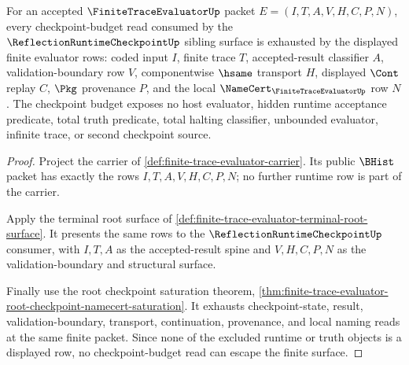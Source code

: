 \begin{theorem}
\label{thm:finite-trace-evaluator-checkpoint-budget-exhaustion}
For an accepted $\FiniteTraceEvaluatorUp$ packet
$E=(I,T,A,V,H,C,P,N)$, every checkpoint-budget read consumed by the
$\ReflectionRuntimeCheckpointUp$ sibling surface is exhausted by the displayed
finite evaluator rows: coded input $I$, finite trace $T$, accepted-result
classifier $A$, validation-boundary row $V$, componentwise $\hsame$ transport
$H$, displayed $\Cont$ replay $C$, $\Pkg$ provenance $P$, and the local
$\NameCert_{\FiniteTraceEvaluatorUp}$ row $N$. The checkpoint budget exposes no
host evaluator, hidden runtime acceptance predicate, total truth predicate,
total halting classifier, unbounded evaluator, infinite trace, or second
checkpoint source.
\end{theorem}
\begin{proof}
Project the carrier of \autoref{def:finite-trace-evaluator-carrier}. Its
public $\BHist$ packet has exactly the rows $I,T,A,V,H,C,P,N$; no further
runtime row is part of the carrier.

Apply the terminal root surface of
\autoref{def:finite-trace-evaluator-terminal-root-surface}. It presents the
same rows to the $\ReflectionRuntimeCheckpointUp$ consumer, with $I,T,A$ as the
accepted-result spine and $V,H,C,P,N$ as the validation-boundary and structural
surface.

Finally use the root checkpoint saturation theorem,
\autoref{thm:finite-trace-evaluator-root-checkpoint-namecert-saturation}. It
exhausts checkpoint-state, result, validation-boundary, transport,
continuation, provenance, and local naming reads at the same finite packet.
Since none of the excluded runtime or truth objects is a displayed row, no
checkpoint-budget read can escape the finite surface.
\end{proof}


